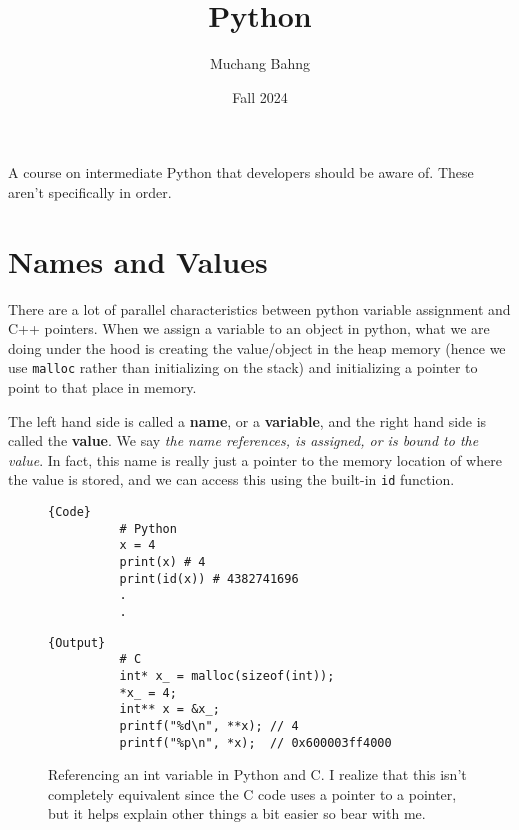 \documentclass{article}
\begin{document}
\title{Python}
\author{Muchang Bahng}
\date{Fall 2024}

\maketitle
\tableofcontents
\pagebreak

A course on intermediate Python that developers should be aware of. These aren't specifically in order. 

\section{Names and Values}

    There are a lot of parallel characteristics between python variable assignment and C++ pointers. When we assign a variable to an object in python, what we are doing under the hood is creating the value/object in the heap memory (hence we use \texttt{malloc} rather than initializing on the stack) and initializing a pointer to point to that place in memory. 

    The left hand side is called a \textbf{name}, or a \textbf{variable}, and the right hand side is called the \textbf{value}. We say \textit{the name references, is assigned, or is bound to the value}. In fact, this name is really just a pointer to the memory location of where the value is stored, and we can access this using the built-in \texttt{id} function. 

    \begin{figure}[H]
      \centering 
      \begin{minipage}{.5\textwidth}
        \begin{lstlisting}[]{Code}
          # Python 
          x = 4
          print(x) # 4
          print(id(x)) # 4382741696
          .
          .
        \end{lstlisting}
        \end{minipage}
        \hfill
        \begin{minipage}{.49\textwidth}
        \begin{lstlisting}[]{Output}
          # C  
          int* x_ = malloc(sizeof(int)); 
          *x_ = 4; 
          int** x = &x_; 
          printf("%d\n", **x); // 4
          printf("%p\n", *x);  // 0x600003ff4000
        \end{lstlisting}
      \end{minipage}
      \caption{Referencing an int variable in Python and C. I realize that this isn't completely equivalent since the C code uses a pointer to a pointer, but it helps explain other things a bit easier so bear with me. } 
      \label{fig:int}
    \end{figure}
\end{document}
